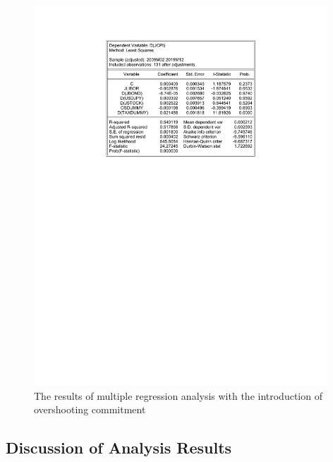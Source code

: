 \documentclass[12pt]{article}
\begin{document}
\begin{figure}[!htbp]
    \centering
    \caption{The results of multiple regression analysis with the introduction of overshooting commitment}
    \vspace{5pt}
    \includegraphics[width=11cm]{os.pdf}
\end{figure}

\newpage

\subsection{Discussion of Analysis Results}
\end{document}
